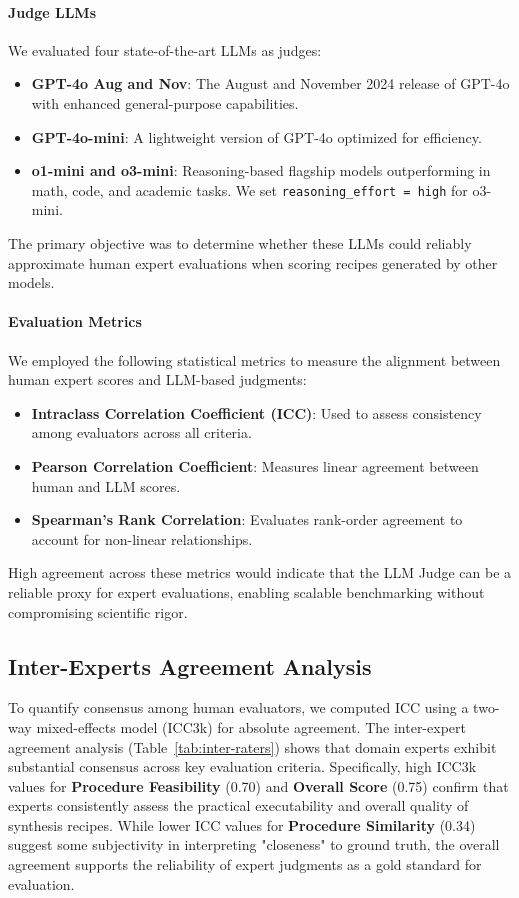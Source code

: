 \paragraph*{Judge LLMs}
We evaluated four state-of-the-art LLMs as judges:
\begin{itemize}
    \item \textbf{GPT-4o Aug and Nov}: The August and November 2024 release of GPT-4o with enhanced general-purpose capabilities.
    \item \textbf{GPT-4o-mini}: A lightweight version of GPT-4o optimized for efficiency.
    \item \textbf{o1-mini and o3-mini}: Reasoning-based flagship models outperforming in math, code, and academic tasks. We set \texttt{reasoning\_effort = high} for o3-mini.
\end{itemize}

The primary objective was to determine whether these LLMs could reliably approximate human expert evaluations when scoring recipes generated by other models.

\paragraph*{Evaluation Metrics}
We employed the following statistical metrics to measure the alignment between human expert scores and LLM-based judgments:
\begin{itemize}
    \item \textbf{Intraclass Correlation Coefficient (ICC)}: Used to assess consistency among evaluators across all criteria.
    \item \textbf{Pearson Correlation Coefficient}: Measures linear agreement between human and LLM scores.
    \item \textbf{Spearman’s Rank Correlation}: Evaluates rank-order agreement to account for non-linear relationships.
\end{itemize}

High agreement across these metrics would indicate that the LLM Judge can be a reliable proxy for expert evaluations, enabling scalable benchmarking without compromising scientific rigor.


\subsection{Inter-Experts Agreement Analysis}


To quantify consensus among human evaluators, we computed ICC using a two-way mixed-effects model (ICC3k) for absolute agreement. The inter-expert agreement analysis (Table~\ref{tab:inter-raters}) shows that domain experts exhibit substantial consensus across key evaluation criteria. Specifically, high ICC3k values for \textbf{Procedure Feasibility} (0.70) and \textbf{Overall Score} (0.75) confirm that experts consistently assess the practical executability and overall quality of synthesis recipes. While lower ICC values for \textbf{Procedure Similarity} (0.34) suggest some subjectivity in interpreting "closeness" to ground truth, the overall agreement supports the reliability of expert judgments as a gold standard for evaluation.  


